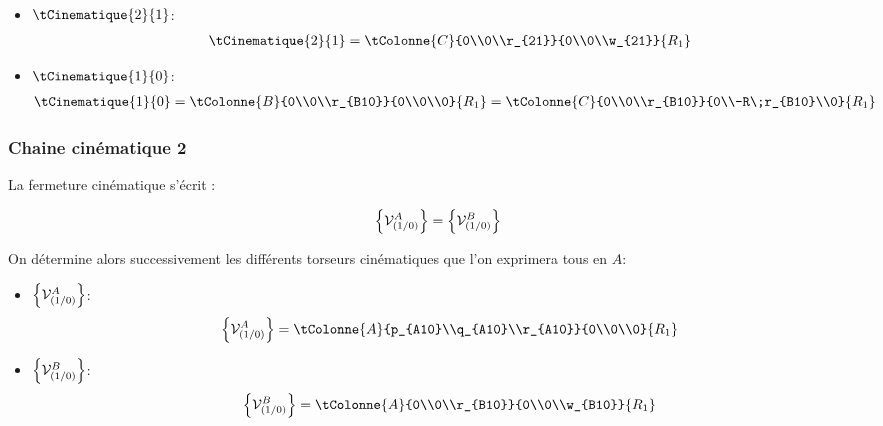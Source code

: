 \documentclass[10pt,fleqn]{article} %
\begin{document}
\begin{multicols}{2}
\begin{multicols}{2}
\begin{itemize}
\begin{align*}
				\end{align*}
				\else\fi
\item \textbf{$\tCinematique{2}{1}$}:\\
\ifprof
				\begin{align*}
					\tCinematique{2}{1}	
					=	\tColonne{C}{0\\0\\r_{21}}{0\\0\\w_{21}}{R_{1}}
				\end{align*}
				\else\fi
\item \textbf{$\tCinematique{1}{0}$}:\\
\ifprof
				\begin{align*}
					\tCinematique{1}{0}	
					=	\tColonne{B}{0\\0\\r_{B10}}{0\\0\\0}{R_{1}}
					=	\tColonne{C}{0\\0\\r_{B10}}{0\\-R\;r_{B10}\\0}{R_{1}}
				\end{align*}
\else\fi

\end{itemize}
\else \fi				
		


\subsubsection{Chaine cinématique 2}
La fermeture cinématique s'écrit :

		\begin{align*}
		\left\{{\mathcal{V}^{A}_{(1/0)}}\right\}		=	\left\{{\mathcal{V}^{B}_{(1/0)}}\right\}
		\end{align*}
		
		On détermine alors successivement les différents torseurs cinématiques que l'on exprimera tous en $A$:

		\begin{itemize}
\item \textbf{$\left\{{\mathcal{V}^{A}_{(1/0)}}\right\}$}:\\
\ifprof
				\begin{align*}
					\torseur{\mathcal{V}^{A}_{(1/0)}}	
					=	\tColonne{A}{p_{A10}\\q_{A10}\\r_{A10}}{0\\0\\0}{R_{1}}
				\end{align*}
\else\fi
\item \textbf{$\left\{{\mathcal{V}^{B}_{(1/0)}}\right\}$}:\\
\ifprof
				\begin{align*}
					\torseur{\mathcal{V}^{B}_{(1/0)}}
					=	\tColonne{A}{0\\0\\r_{B10}}{0\\0\\w_{B10}}{R_{1}}
				\end{align*}
\else\fi


\end{itemize}
\end{multicols}
\end{multicols}
\end{document}
